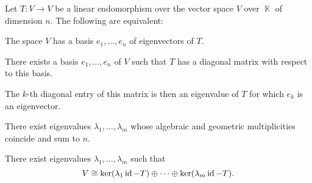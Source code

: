 \begin{proposition}\label{thm:operator_diagonalizability}
  Let \( T: V \to V \) be a linear endomorphism over the vector space \( V \) over \( \BbbK \) of dimension \( n \). The following are equivalent:
  \begin{thmenum}
     The space \( V \) has a basis \( e_1, \ldots, e_n \) of eigenvectors of \( T \).

     There exists a basis \( e_1, \ldots, e_n \) of \( V \) such that \( T \) has a diagonal matrix with respect to this basis.

    The \( k \)-th diagonal entry of this matrix is then an eigenvalue of \( T \) for which \( e_k \) is an eigenvector.

     There exist eigenvalues \( \lambda_1, \ldots, \lambda_m \) whose algebraic and geometric multiplicities coincide and sum to \( n \).

     There exist eigenvalues \( \lambda_1, \ldots, \lambda_m \) such that
    \begin{equation*}
      V \cong \ker(\lambda_1 \operatorname{id} - T) \oplus \cdots \oplus \ker(\lambda_m \operatorname{id} - T).
    \end{equation*}
  \end{thmenum}
\end{proposition}
